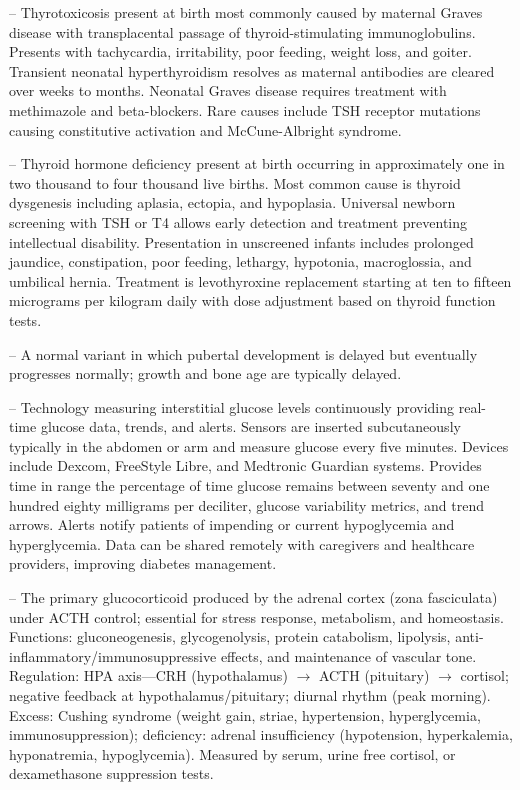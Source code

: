 -- Thyrotoxicosis present at birth most commonly caused by maternal Graves disease with transplacental passage of thyroid-stimulating immunoglobulins. Presents with tachycardia, irritability, poor feeding, weight loss, and goiter. Transient neonatal hyperthyroidism resolves as maternal antibodies are cleared over weeks to months. Neonatal Graves disease requires treatment with methimazole and beta-blockers. Rare causes include TSH receptor mutations causing constitutive activation and McCune-Albright syndrome.

-- Thyroid hormone deficiency present at birth occurring in approximately one in two thousand to four thousand live births. Most common cause is thyroid dysgenesis including aplasia, ectopia, and hypoplasia. Universal newborn screening with TSH or T4 allows early detection and treatment preventing intellectual disability. Presentation in unscreened infants includes prolonged jaundice, constipation, poor feeding, lethargy, hypotonia, macroglossia, and umbilical hernia. Treatment is levothyroxine replacement starting at ten to fifteen micrograms per kilogram daily with dose adjustment based on thyroid function tests.

-- A normal variant in which pubertal development is delayed but eventually progresses normally; growth and bone age are typically delayed.

-- Technology measuring interstitial glucose levels continuously providing real-time glucose data, trends, and alerts. Sensors are inserted subcutaneously typically in the abdomen or arm and measure glucose every five minutes. Devices include Dexcom, FreeStyle Libre, and Medtronic Guardian systems. Provides time in range the percentage of time glucose remains between seventy and one hundred eighty milligrams per deciliter, glucose variability metrics, and trend arrows. Alerts notify patients of impending or current hypoglycemia and hyperglycemia. Data can be shared remotely with caregivers and healthcare providers, improving diabetes management.

-- The primary glucocorticoid produced by the adrenal cortex (zona fasciculata) under ACTH control; essential for stress response, metabolism, and homeostasis. Functions: gluconeogenesis, glycogenolysis, protein catabolism, lipolysis, anti-inflammatory/immunosuppressive effects, and maintenance of vascular tone. Regulation: HPA axis—CRH (hypothalamus) $\rightarrow$ ACTH (pituitary) $\rightarrow$ cortisol; negative feedback at hypothalamus/pituitary; diurnal rhythm (peak morning). Excess: Cushing syndrome (weight gain, striae, hypertension, hyperglycemia, immunosuppression); deficiency: adrenal insufficiency (hypotension, hyperkalemia, hyponatremia, hypoglycemia). Measured by serum, urine free cortisol, or dexamethasone suppression tests.

